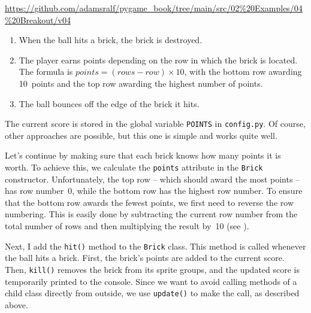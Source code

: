 \begin{diskbox}
	\url{https://github.com/adamsralf/pygame_book/tree/main/src/02%20Examples/04%20Breakout/v04}
\end{diskbox}

\begin{enumerate}
	\item When the ball hits a brick, the brick is destroyed.
	\item The player earns points depending on the row in which the brick is located. The formula is $points = (rows - row) \times 10$, with the bottom row awarding 10~points and the top row awarding the highest number of points.
	\item The ball bounces off the edge of the brick it hits.
\end{enumerate}
\er

The current score is stored in the global variable \texttt{POINTS} in \texttt{config.py}. Of course, other approaches are possible, but this one is simple and works quite well.


Let's continue by making sure that each brick knows how many points it is worth. To achieve this, we calculate the \texttt{points} attribute in the \texttt{Brick} constructor. Unfortunately, the top row -- which should award the most points -- has row number~0, while the bottom row has the highest row number. To ensure that the bottom row awards the fewest points, we first need to reverse the row numbering. This is easily done by subtracting the current row number from the total number of rows and then multiplying the result by~10 (see ).


Next, I add the \texttt{hit()} method to the \texttt{Brick} class. This method is called whenever the ball hits a brick. First, the brick's points are added to the current score. Then, \texttt{kill()} removes the brick from its sprite groups, and the updated score is temporarily printed to the console. 
Since we want to avoid calling methods of a child class directly from outside, we use \texttt{update()} to make the call, as described above.

